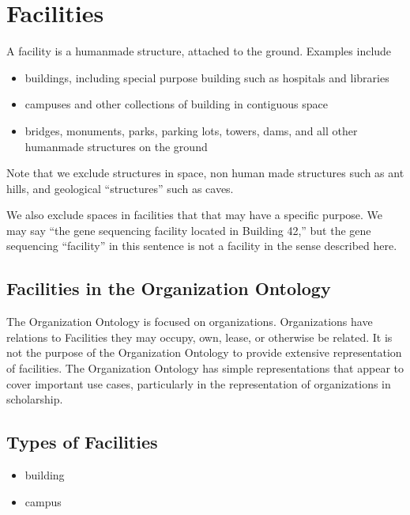 \documentclass[letterpaper,10pt,english]{sphinxmanual}
\begin{document}
\chapter{Facilities}
\label{\detokenize{facilities:index-0}}\label{\detokenize{facilities:id1}}\label{\detokenize{facilities::doc}}
\sphinxAtStartPar
A facility is a human\sphinxhyphen{}made structure, attached to the ground.  Examples include
\begin{itemize}
\item {} 
\sphinxAtStartPar
buildings, including special purpose building such as hospitals and libraries

\item {} 
\sphinxAtStartPar
campuses and other collections of building in contiguous space

\item {} 
\sphinxAtStartPar
bridges, monuments, parks, parking lots, towers, dams, and all other human\sphinxhyphen{}made
structures on the ground

\end{itemize}

\sphinxAtStartPar
Note that we exclude structures in space, non human made structures such as ant hills,
and geological “structures” such as caves.

\sphinxAtStartPar
We also exclude spaces in facilities that that may have a specific purpose.  We may say
“the gene sequencing facility located in Building 42,” but the gene sequencing
“facility” in this sentence is not a facility in the sense described here.


\section{Facilities in the Organization Ontology}
\label{\detokenize{facilities:facilities-in-the-organization-ontology}}
\sphinxAtStartPar
The Organization Ontology is focused on organizations.  Organizations have relations
to Facilities \textendash{} they may occupy, own, lease, or otherwise be related.  It is
not the purpose of the Organization Ontology to provide extensive representation of
facilities.  The Organization Ontology has simple representations that appear to cover
important use cases, particularly in the representation of organizations in scholarship.


\section{Types of Facilities}
\label{\detokenize{facilities:types-of-facilities}}\begin{itemize}
\item {} 
\sphinxAtStartPar
building

\item {} 
\sphinxAtStartPar
campus

\end{itemize}
\end{document}

